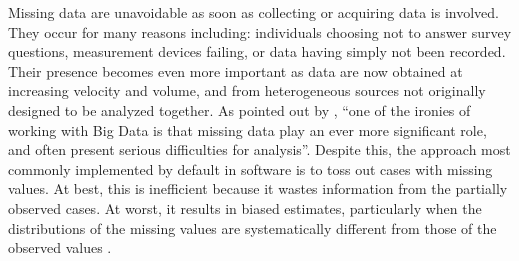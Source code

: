 Missing data are unavoidable as soon as collecting or acquiring data is 
involved. They occur for many reasons including: individuals choosing not to 
answer survey questions, measurement devices failing, or data having simply not been recorded.
Their presence becomes even more important as data are now
obtained at increasing velocity and volume, and from heterogeneous sources not originally designed
to be analyzed together. As pointed out by \citet{zhu2019high}, ``one of the
ironies of working with Big Data is that missing data play an ever more
significant role, and often present serious difficulties for analysis''.
Despite this, the approach most commonly implemented by default in
software is to toss out cases with missing values. At best, this is inefficient
because it wastes information from the partially observed cases. At worst, it
results in biased estimates, particularly when the distributions of the missing
values are systematically different from those of the observed values \citep[e.g.,][Chap. 2]{enders_AMDA2010}.

